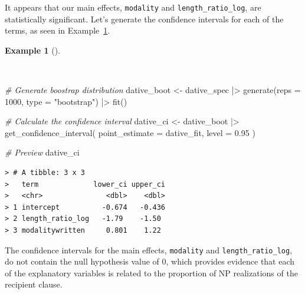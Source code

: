 \documentclass[
  letterpaper,
]{latex/krantz}
\newenvironment{Shaded}{\begin{snugshade}}{\end{snugshade}}
\newcommand{\AttributeTok}[1]{\textcolor[rgb]{0.00,0.00,0.00}{#1}}
\newcommand{\CommentTok}[1]{\textcolor[rgb]{0.00,0.00,0.00}{\textit{#1}}}
\newcommand{\DecValTok}[1]{\textcolor[rgb]{0.00,0.00,0.00}{#1}}
\newcommand{\FloatTok}[1]{\textcolor[rgb]{0.00,0.00,0.00}{#1}}
\newcommand{\FunctionTok}[1]{\textcolor[rgb]{0.00,0.00,0.00}{#1}}
\newcommand{\NormalTok}[1]{\textcolor[rgb]{0.00,0.00,0.00}{#1}}
\newcommand{\OtherTok}[1]{\textcolor[rgb]{0.00,0.00,0.00}{#1}}
\newcommand{\SpecialCharTok}[1]{\textcolor[rgb]{0.00,0.00,0.00}{#1}}
\newcommand{\StringTok}[1]{\textcolor[rgb]{0.00,0.00,0.00}{#1}}
\theoremstyle{definition}
\newtheorem{example}{Example}[chapter]
\theoremstyle{remark}
\begin{document}
It appears that our main effects, \texttt{modality} and
\texttt{length\_ratio\_log}, are statistically significant. Let's
generate the confidence intervals for each of the terms, as seen in
Example~\ref{exm-ida-cat-confidence-interval-logistic-regression}.

\begin{example}[]\protect\hypertarget{exm-ida-cat-confidence-interval-logistic-regression}{}\label{exm-ida-cat-confidence-interval-logistic-regression}

~

\begin{Shaded}
\begin{Highlighting}[]
\CommentTok{\# Generate boostrap distribution}
\NormalTok{dative\_boot }\OtherTok{\textless{}{-}}
\NormalTok{  dative\_spec }\SpecialCharTok{|\textgreater{}}
  \FunctionTok{generate}\NormalTok{(}\AttributeTok{reps =} \DecValTok{1000}\NormalTok{, }\AttributeTok{type =} \StringTok{"bootstrap"}\NormalTok{) }\SpecialCharTok{|\textgreater{}}
  \FunctionTok{fit}\NormalTok{()}

\CommentTok{\# Calculate the confidence interval}
\NormalTok{dative\_ci }\OtherTok{\textless{}{-}}
\NormalTok{  dative\_boot }\SpecialCharTok{|\textgreater{}}
  \FunctionTok{get\_confidence\_interval}\NormalTok{(}
    \AttributeTok{point\_estimate =}\NormalTok{ dative\_fit,}
    \AttributeTok{level =} \FloatTok{0.95}
\NormalTok{  )}

\CommentTok{\# Preview}
\NormalTok{dative\_ci}
\end{Highlighting}
\end{Shaded}

\begin{verbatim}
> # A tibble: 3 x 3
>   term             lower_ci upper_ci
>   <chr>               <dbl>    <dbl>
> 1 intercept          -0.674   -0.436
> 2 length_ratio_log   -1.79    -1.50 
> 3 modalitywritten     0.801    1.22
\end{verbatim}

\end{example}

The confidence intervals for the main effects, \texttt{modality} and
\texttt{length\_ratio\_log}, do not contain the null hypothesis value of
0, which provides evidence that each of the explanatory variables is
related to the proportion of NP realizations of the recipient clause.
\end{document}
